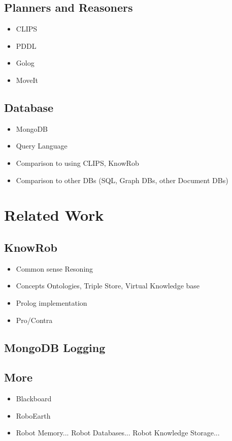 \documentclass[a4paper,11pt]{article}
\begin{document}
\subsection{Planners and Reasoners}
\begin{itemize}
\item CLIPS
\item PDDL
\item Golog
\item MoveIt
\end{itemize}
\subsection{Database}
\begin{itemize}
\item MongoDB
\item Query Language
\item Comparison to using CLIPS, KnowRob
\item Comparison to other DBs (SQL, Graph DBs, other Document DBs)
\end{itemize}

\section{Related Work}
\subsection{KnowRob}
\begin{itemize}
\item Common sense Resoning
\item Concepts Ontologies, Triple Store, Virtual Knowledge base
\item Prolog implementation
\item Pro/Contra
\end{itemize}
\subsection{MongoDB Logging}
\subsection{More}
\begin{itemize}
\item Blackboard
\item RoboEarth
\item Robot Memory... Robot Databases... Robot Knowledge Storage...
\end{itemize}
\end{document}
